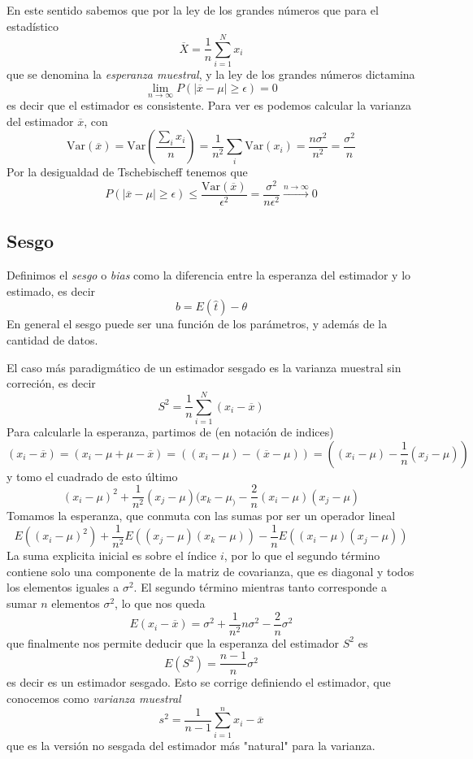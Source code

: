 \documentclass{article}
\numberwithin{equation}{section} %
\begin{document}
En este sentido sabemos que por la ley de los grandes números que para el estadístico
\begin{equation}
\overline{X} = \frac{1}{n} \sum_{i=1}^{N} x_i
\end{equation}
que se denomina la \emph{esperanza muestral}, y la ley de los grandes números dictamina
\begin{equation}
\lim_{n\to\infty}P(|\overline{x} - \mu|\geq\epsilon) = 0
\end{equation}
es decir que el estimador es consistente. Para ver es podemos calcular la varianza del estimador $\overline{x}$, con
\[\text{Var}(\overline{x}) = \text{Var}\left(\frac{\sum_{i} x_i}{n}\right) = \frac{1}{n^2} \sum_i \text{Var}(x_i) = \frac{n \sigma^2}{n^2} = \frac{\sigma^2}{n}\]
Por la desigualdad de Tschebischeff tenemos que
\[P(|\overline{x} - \mu|\geq \epsilon) \leq \frac{\text{Var}(\overline{x})}{\epsilon^2} = \frac{\sigma^2}{n \epsilon^2} \xrightarrow{n\to\infty} 0\]


\subsection{Sesgo}
Definimos el \emph{sesgo} o \emph{bias} como la diferencia entre la esperanza del estimador y lo estimado, es decir
\begin{equation}
b = E(\hat{t}) - \theta
\end{equation}
En general el sesgo puede ser una función de los parámetros, y además de la cantidad de datos. 

El caso más paradigmático de un estimador sesgado es la varianza muestral sin correción, es decir
\begin{equation}
S^2 = \frac{1}{n} \sum_{i=1}^{N} (x_i - \overline{x})
\end{equation}
Para calcularle la esperanza, partimos de (en notación de indices)
\[(x_i - \overline{x}) = (x_i - \mu + \mu - \overline{x}) = ((x_i - \mu) - (\overline{x} - \mu)) = ((x_i - \mu) - \frac{1}{n} (x_j - \mu))\]
y tomo el cuadrado de esto último
\[(x_i - \mu)^2 + \frac{1}{n^2} (x_j - \mu) (x_k - \mu_) - \frac{2}{n} (x_i - \mu) (x_j - \mu) \]
Tomamos la esperanza, que conmuta con las sumas por ser un operador lineal
\[E((x_i - \mu)^2) + \frac{1}{n^2} E((x_j - \mu)(x_k - \mu)) - \frac{1}{n} E((x_i - \mu)(x_j - \mu))\]
La suma explicita inicial es sobre el índice $i$, por lo que el segundo término contiene solo una componente de la matriz de covarianza, que es diagonal y todos los elementos iguales a $\sigma^2$. El segundo término mientras tanto corresponde a sumar $n$ elementos $\sigma^2$, lo que nos queda
\[E(x_i - \overline{x}) = \sigma^2 + \frac{1}{n^2} n \sigma^2 - \frac{2}{n} \sigma^2\]
que finalmente nos permite deducir que la esperanza del estimador $S^2$ es
\begin{equation}
E(S^2) = \frac{n - 1}{n} \sigma^2
\end{equation}
es decir es un estimador sesgado. Esto se corrige definiendo el estimador, que conocemos como \emph{varianza muestral}
\begin{equation}
s^2 = \frac{1}{n - 1} \sum_{i=1}^{n} x_i - \overline{x}
\end{equation}
que es la versión no sesgada del estimador más "natural" para la varianza.
\end{document}
